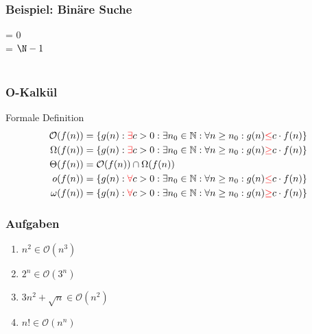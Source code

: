 \begin{frame}
	\frametitle{Beispiel: Binäre Suche}
	\begin{algorithm}[H]
		\pause
		\MinIndex = 0\\
		\MaxIndex = $\N - 1$\\
		\\
	\end{algorithm}
\end{frame}

\begin{frame}
	\frametitle{O-Kalkül}
	\begin{block}{Formale Definition}
		\begin{align*}
			\mathcal{O}(f(n)) &= \{g(n):{\color{red}\exists} c > 0: \exists n_0 \in \mathbb{N}: \forall n \ge n_0: g(n) {\color{red}\le} c \cdot f(n)\}\\
			\Omega(f(n)) &= \{g(n):{\color{red}\exists} c > 0: \exists n_0 \in \mathbb{N}: \forall n \ge n_0: g(n) {\color{red}\ge} c \cdot f(n)\}\\
			\Theta(f(n)) &= \mathcal{O}(f(n)) \cap \Omega(f(n))\\
			o(f(n)) &= \{g(n):{\color{red}\forall} c > 0: \exists n_0 \in \mathbb{N}: \forall n \ge n_0: g(n) {\color{red}\le} c \cdot f(n)\}\\
			\omega(f(n)) &= \{g(n):{\color{red}\forall} c > 0: \exists n_0 \in \mathbb{N}: \forall n \ge n_0: g(n) {\color{red}\ge} c \cdot f(n)\}\\
		\end{align*}
	\end{block}
\end{frame}

\begin{frame}
	\frametitle{Aufgaben}
	\begin{enumerate}
		\item $n^2 \in \mathcal{O}(n^3)$
		\item $2^n \in \mathcal{O}(3^n)$
		\item $3n^2 + \sqrt{n} \in \mathcal{O}(n^2)$
		\item $n! \in \mathcal{O}(n^n)$
	\end{enumerate}
\end{frame}

